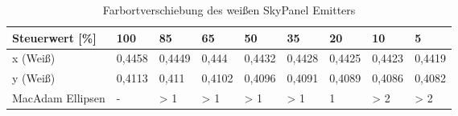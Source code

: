 \documentclass[11pt]{scrartcl}
\begin{document}
\noindent
\begin{table}[H]
    \begin{tabularx}{\textwidth}{|l|X|X|X|X|X|X|X|X|}
        \hline
        Steuerwert [\%]  & 100    & 85     & 65     & 50     & 35     & 20     & 10     & 5      \\\hline
        x (Weiß)         & 0,4458 & 0,4449 & 0,444  & 0,4432 & 0,4428 & 0,4425 & 0,4423 & 0,4419 \\\hline
        y (Weiß)         & 0,4113 & 0,411  & 0,4102 & 0,4096 & 0,4091 & 0,4089 & 0,4086 & 0,4082 \\\hline
        MacAdam Ellipsen & -      & > 1    & > 1    & > 1    & > 1    & 1      & > 2    & > 2    \\\hline
    \end{tabularx}
    \caption{Farbortverschiebung des weißen SkyPanel Emitters}
\end{table}
\noindent
\clearpage
\end{document}
